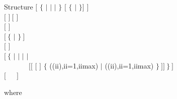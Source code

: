 \begin{DataStructure}{Structure }
$[$  $\{$  $|$  $|$  $|$  $\}$  
  $[$  $\{$  $|$  $\}$$]$ $]$ \\
$[$  $]~[$  $]$ \\
$[$   $]$ \\
$[~\{$  $|$  $\}~]$ \\
$[$   $]$ \\
$[~\{$  $|$  $|$  $|$  $|$\\
~~~~~~~$[[$  $[$ \moc{*} $]$  $\{$  ((ii),ii=1,iimax)  $|$  ((ii),ii=1,iimax)  $\}~]]~\}~]$ \\
$[$~~~$]$
\end{DataStructure}

\noindent where

